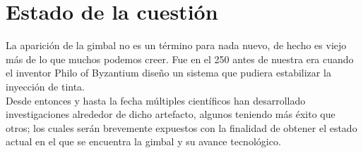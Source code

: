 \section{Estado de la cuestión}
La aparición de la gimbal no es un término para nada nuevo, de hecho es viejo más de lo que
muchos podemos creer. Fue en el 250 antes de nuestra era cuando el inventor Philo of Byzantium diseño un sistema que pudiera estabilizar la inyección de tinta. \cite{WEB:Gimbal}\\
Desde entonces y hasta la fecha múltiples científicos han desarrollado investigaciones alrededor
de dicho artefacto, algunos teniendo más éxito que otros; los cuales serán brevemente expuestos
con la finalidad de obtener el estado actual en el que se encuentra la gimbal y su avance
tecnológico.
